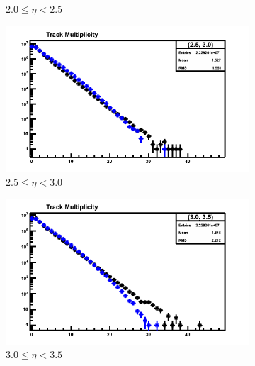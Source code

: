 \begin{figure}[h]
\begin{subfigure}[h]{0.32\textwidth}
		\caption{$2.0 \le \eta < 2.5$}
		\label{fig: reconstructed track multiplicity mc down 2.0 - 2.5}
	\end{subfigure}
	\begin{subfigure}[h]{0.32\textwidth}
		\includegraphics[width=\textwidth]{./Chapters/multiplicity/images/reconstructed_multiplicity_2_5_3_0_mc_down.png}
		\caption{$2.5 \le \eta < 3.0$}
		\label{fig: reconstructed track multiplicity mc down 2.5 - 3.0}
	\end{subfigure}
	\begin{subfigure}[h]{0.32\textwidth}
		\includegraphics[width=\textwidth]{./Chapters/multiplicity/images/reconstructed_multiplicity_3_0_3_5_mc_down.png}
		\caption{$3.0 \le \eta < 3.5$}
		\label{fig: reconstructed track multiplicity mc down 3.0 - 3.5}
	\end{subfigure}
	\begin{subfigure}[h]{0.32\textwidth}

\end{subfigure}
\end{figure}
